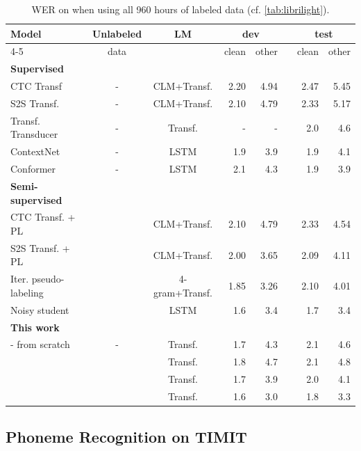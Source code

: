 \documentclass{article}
\begin{document}
\begin{table}
\caption{%
WER on \libri{} when using all 960 hours of labeled data (cf. \autoref{tab:librilight}).
}
\label{tab:librispeech}
\centering 
\begin{tabular}{lccrrrrr}
\toprule
\multirow{2}{*}{Model} & Unlabeled & \multirow{2}{*}{LM} & \multicolumn{2}{c}{dev} && \multicolumn{2}{c}{test} \\
\cline{4-5}\cline{7-8} 
{} & data & {} & clean & other && clean & other \\
\midrule
\textbf{Supervised} \\
CTC Transf~\citep{synnaeve2020end} & - & CLM+Transf. & 2.20 & 4.94 && 2.47 & 5.45 \\
S2S Transf. ~\citep{synnaeve2020end} & - & CLM+Transf. & 2.10 & 4.79 && 2.33 & 5.17 \\
Transf. Transducer~\citep{zhang2020transformer} & - & Transf. & - & - && 2.0 & 4.6 \\
ContextNet~\citep{han2020contextnet} & - & LSTM & 1.9 & 3.9 && 1.9 & 4.1 \\
Conformer~\citep{gulati2020conformer} & - & LSTM & 2.1 & 4.3 && 1.9 & 3.9 \\
\midrule
\textbf{Semi-supervised} \\
CTC Transf. + PL~\citep{synnaeve2020end} & \voxsz{} & CLM+Transf. &  2.10 & 4.79 && 2.33 & 4.54 \\
S2S Transf. + PL~\citep{synnaeve2020end} & \voxsz{} & CLM+Transf. &  2.00 & 3.65 && 2.09 & 4.11 \\
Iter. pseudo-labeling~\cite{xu2020iterative} & \voxsz{} & 4-gram+Transf. & 1.85 & 3.26 && 2.10 & 4.01 \\
Noisy student~\citep{park2020improved} & \voxsz{} & LSTM & 1.6 & 3.4 && 1.7 & 3.4 \\
\midrule
\textbf{This work} \\
\wvppbig{} - from scratch & - & Transf. & 1.7 & 4.3 && 2.1 & 4.6 \\
\wvppbase{} & \librisz{} & Transf. & 1.8 & 4.7 && 2.1 & 4.8 \\
\wvppbig{} & \librisz{} & Transf. & 1.7 & 3.9 && 2.0 & 4.1 \\
& \voxsz{} & Transf. & 1.6 & 3.0 && 1.8 & 3.3 \\
\bottomrule
\end{tabular}
\end{table}

\subsection{Phoneme Recognition on TIMIT}
\end{document}
